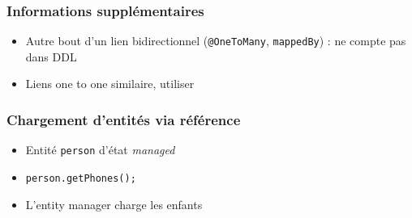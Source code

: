 \documentclass[french, english]{beamer}
\begin{document}
\begin{frame}
	\frametitle{Informations supplémentaires}
	\begin{itemize}
		\item Autre bout d’un lien bidirectionnel (\texttt{@OneToMany}, \texttt{mappedBy}) : ne compte pas dans DDL
		\item Liens one to one similaire, utiliser 
	\end{itemize}
\end{frame}

\begin{frame}
	\frametitle{Chargement d’entités via référence}
	\begin{itemize}
		\item Entité \texttt{person} d’état \emph{managed}
		\item \texttt{person.getPhones();}
		\item L’entity manager charge les enfants
	\end{itemize}
\end{frame}
\end{document}
